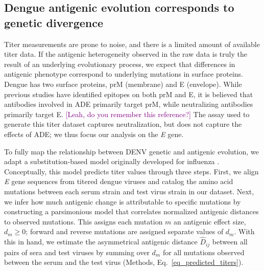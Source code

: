 \documentclass[11pt,oneside,letterpaper]{article}
\def\sbc#1{\textcolor{purple}{[#1]}}
\begin{document}
\subsection*{Dengue antigenic evolution corresponds to genetic divergence}
Titer measurements are prone to noise, and there is a limited amount of available titer data.
If the antigenic heterogeneity observed in the raw data is truly the result of an underlying evolutionary process, we expect that differences in antigenic phenotype correspond to underlying mutations in surface proteins.
Dengue has two surface proteins, prM (membrane) and E (envelope).
While previous studies have identified epitopes on both prM and E, it is believed that antibodies involved in ADE primarily target prM, while neutralizing antibodies primarily target E. \sbc{Leah, do you remember this reference?}
The assay used to generate this titer dataset captures neutralization, but does not capture the effects of ADE; we thus focus our analysis on the \textit{E} gene.

To fully map the relationship between DENV genetic and antigenic evolution, we adapt a substitution-based model originally developed for influenza \citep{neher2016prediction}.
Conceptually, this model predicts titer values through three steps.
First, we align \textit{E} gene sequences from titered dengue viruses and catalog the amino acid mutations between each serum strain and test virus strain in our dataset.
Next, we infer how much antigenic change is attributable to specific mutations by constructing a parsimonious model that correlates normalized antigenic distances to observed mutations.
This assigns each mutation $m$ an antigenic effect size, $d_m \geq 0$; forward and reverse mutations are assigned separate values of $d_m$.
With this in hand, we estimate the asymmetrical antigenic distance $\hat{D}_{ij}$ between all pairs of sera and test viruses by summing over $d_m$ for all mutations observed between the serum and the test virus (Methods, Eq.~\ref{eq_predicted_titers}).
\end{document}
